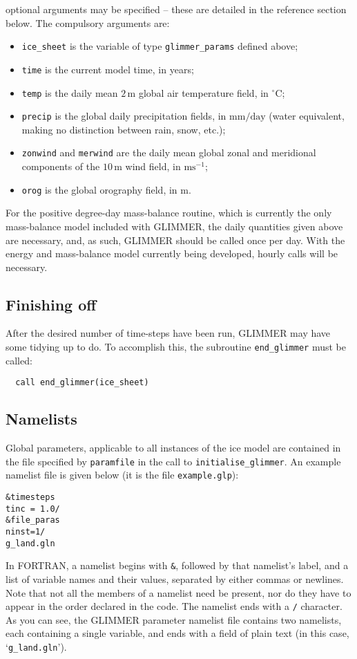 optional arguments may be specified -- these are detailed in the reference
section below. The compulsory arguments are:
%
\begin{itemize}
\item \texttt{ice\_sheet} is the variable of type \texttt{glimmer\_params}
 defined above;
\item \texttt{time} is the current model time, in years;
\item \texttt{temp} is the daily mean $2\,\mathrm{m}$ global air temperature field, in
  $^{\circ}\mathrm{C}$;
\item \texttt{precip} is the global daily precipitation fields,
  in $\mathrm{mm}/\mathrm{day}$ (water equivalent, making no distinction
  between rain, snow, etc.);
\item \texttt{zonwind} and \texttt{merwind} are the daily mean global zonal and
  meridional components of the $10\,\mathrm{m}$ wind field, in
  $\mathrm{ms}^{-1}$;
\item \texttt{orog} is the global orography field, in $\mathrm{m}$.
\end{itemize}
%
For the positive degree-day mass-balance routine, which is currently the only
mass-balance model included with GLIMMER, the daily quantities given above are
necessary, and, as such, GLIMMER should be called once per day. With the
energy and mass-balance model currently being developed, hourly calls will be
necessary. 
%
\subsection{Finishing off}
%
After the desired number of time-steps have been run, GLIMMER may have some
tidying up to do. To accomplish this, the subroutine \texttt{end\_glimmer}
must be called:
%
\begin{verbatim}
  call end_glimmer(ice_sheet)
\end{verbatim}
%
\subsection{Namelists}
%
Global parameters, applicable to all instances of the ice model are contained
in the file specified by \texttt{paramfile} in the call to
\texttt{initialise\_glimmer}. An example namelist file is given below (it is
the file \texttt{example.glp}):
%
\begin{verbatim}
&timesteps
tinc = 1.0/
&file_paras
ninst=1/
g_land.gln
\end{verbatim}
%
In FORTRAN, a namelist begins with \texttt{\&}, followed by that namelist's
label, and a list of variable names and their values, separated by either
commas or newlines. Note that not all the members of a namelist need be
present, nor do they have to appear in the order declared in the code. 
The namelist ends with a \texttt{/} character. As you can see, the GLIMMER
parameter namelist file contains two namelists, each containing a single
variable, and ends with a field of plain text (in this case, `\texttt{g\_land.gln}').

